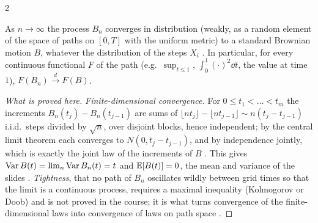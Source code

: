 \begin{paracol}{2}
\begin{theorem}\label{ch11:thm-donsker}
As $n\to\infty$ the process $B_n$ converges in distribution (weakly, as a random element of the space of paths on $[0,T]$
with the uniform metric) to a standard Brownian motion $B$, whatever the distribution of the steps $X_i$
. In particular, for every continuous functional $F$ of the path (e.g.\ $\sup_{t\le1}$, $\int_0^1(\cdot)^2\dd t$,
the value at time $1$), $F(B_n)\xrightarrow{d}F(B)$.
\end{theorem}
\begin{proof}[What is proved here]
\emph{Finite-dimensional convergence.} For $0\le t_1<\dots<t_m$ the increments $B_n(t_j)-B_n(t_{j-1})$ are sums of
$\lfloor nt_j\rfloor-\lfloor nt_{j-1}\rfloor\sim n(t_j-t_{j-1})$ i.i.d.\ steps divided by $\sqrt n$, over disjoint blocks, hence independent; by the central limit
theorem each converges to $N(0,t_j-t_{j-1})$, and by independence jointly, which is exactly the joint law of the increments of $B$
. This gives $\operatorname{Var} B(t)=\lim_n\operatorname{Var} B_n(t)=t$ and $\mathbb{E}[B(t)]=0$, the mean and variance of the slides
. \emph{Tightness}, that no path of $B_n$ oscillates wildly between grid times so that the limit is a
continuous process, requires a maximal inequality (Kolmogorov or Doob) and is not proved in the course; it is what turns
convergence of the finite-dimensional laws into convergence of laws on path space .
\end{proof}


\end{paracol}
